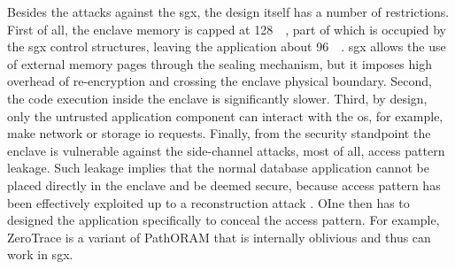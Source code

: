 			Besides the attacks against the \acrshort{sgx}, the design itself has a number of restrictions.
			First of all, the enclave memory is capped at \SI{128}{\mega\byte}, part of which is occupied by the \acrshort{sgx} control structures, leaving the application about \SI{96}{\mega\byte}.
			\acrshort{sgx} allows the use of external memory pages through the sealing mechanism, but it imposes high overhead of re-encryption and crossing the enclave physical boundary.
			Second, the code execution inside the enclave is significantly slower.
			Third, by design, only the untrusted application component can interact with the \acrshort{os}, for example, make network or storage \acrshort{io} requests.
			Finally, from the security standpoint the enclave is vulnerable against the side-channel attacks, most of all, access pattern leakage.
			Such leakage implies that the normal database application cannot be placed directly in the enclave and be deemed secure, because access pattern has been effectively exploited up to a reconstruction attack \cite{generic-attacks-kellaris}.
			OIne then has to designed the application specifically to conceal the access pattern.
			For example, ZeroTrace \cite{zerotrace} is a variant of PathORAM \cite{path-oram} that is internally oblivious and thus can work in \acrshort{sgx}.
